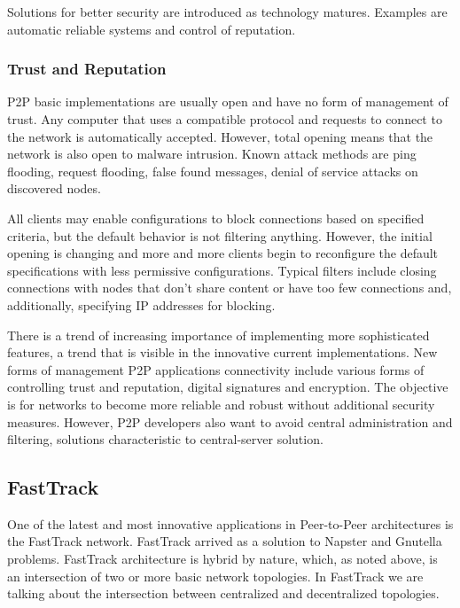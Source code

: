 Solutions for better security are introduced as technology matures. Examples
are automatic reliable systems and control of reputation.

\subsubsection{Trust and Reputation}

P2P basic implementations are usually open and have no form of management of
trust. Any computer that uses a compatible protocol and requests to connect to
the network is automatically accepted. However, total opening means that the
network is also open to malware intrusion. Known attack methods are ping
flooding, request flooding, false found messages, denial of service attacks on
discovered nodes.

All clients may enable configurations to block connections based on specified
criteria, but the default behavior is not filtering anything. However, the
initial opening is changing and more and more clients begin to reconfigure the
default specifications with less permissive configurations. Typical filters
include closing connections with nodes that don't share content or have
too few connections and, additionally, specifying IP addresses for blocking.

There is a trend of increasing importance of implementing more
sophisticated features, a trend that is visible in the innovative current
implementations. New forms of management P2P applications connectivity include
various forms of controlling trust and reputation, digital signatures and
encryption. The objective is for networks to become more reliable and robust
without additional security measures. However, P2P developers also want to
avoid central administration and filtering, solutions characteristic to
central-server solution.

\subsection{FastTrack}

One of the latest and most innovative  applications in Peer-to-Peer
architectures is the FastTrack network. FastTrack arrived as a solution to
Napster and Gnutella problems. FastTrack architecture is hybrid by nature,
which, as noted above, is an intersection of two or more basic network
topologies. In FastTrack we are talking about the intersection between
centralized and decentralized topologies.

